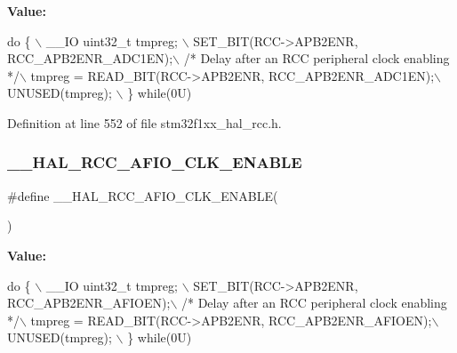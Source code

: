{\bfseries Value\+:}
\begin{DoxyCode}
\textcolor{keywordflow}{do} \{ \(\backslash\)
                                        \_\_IO uint32\_t tmpreg; \(\backslash\)
                                        SET\_BIT(RCC->APB2ENR, RCC\_APB2ENR\_ADC1EN);\(\backslash\)
                                        \textcolor{comment}{/* Delay after an RCC peripheral clock enabling */}\(\backslash\)
                                        tmpreg = READ\_BIT(RCC->APB2ENR, RCC\_APB2ENR\_ADC1EN);\(\backslash\)
                                        UNUSED(tmpreg); \(\backslash\)
                                      \} \textcolor{keywordflow}{while}(0U)
\end{DoxyCode}


Definition at line 552 of file stm32f1xx\+\_\+hal\+\_\+rcc.\+h.

\mbox{\label{group___r_c_c___a_p_b2___clock___enable___disable_ga045c3af72300d80014bbd1bdc9d40797}} 
\subsubsection{\texorpdfstring{\+\_\+\+\_\+\+H\+A\+L\+\_\+\+R\+C\+C\+\_\+\+A\+F\+I\+O\+\_\+\+C\+L\+K\+\_\+\+E\+N\+A\+B\+LE}{\_\_HAL\_RCC\_AFIO\_CLK\_ENABLE}}
{\footnotesize\ttfamily \#define \+\_\+\+\_\+\+H\+A\+L\+\_\+\+R\+C\+C\+\_\+\+A\+F\+I\+O\+\_\+\+C\+L\+K\+\_\+\+E\+N\+A\+B\+LE(\begin{DoxyParamCaption}{ }\end{DoxyParamCaption})}

{\bfseries Value\+:}
\begin{DoxyCode}
\textcolor{keywordflow}{do} \{ \(\backslash\)
                                        \_\_IO uint32\_t tmpreg; \(\backslash\)
                                        SET\_BIT(RCC->APB2ENR, RCC\_APB2ENR\_AFIOEN);\(\backslash\)
                                        \textcolor{comment}{/* Delay after an RCC peripheral clock enabling */}\(\backslash\)
                                        tmpreg = READ\_BIT(RCC->APB2ENR, RCC\_APB2ENR\_AFIOEN);\(\backslash\)
                                        UNUSED(tmpreg); \(\backslash\)
                                      \} \textcolor{keywordflow}{while}(0U)
\end{DoxyCode}


